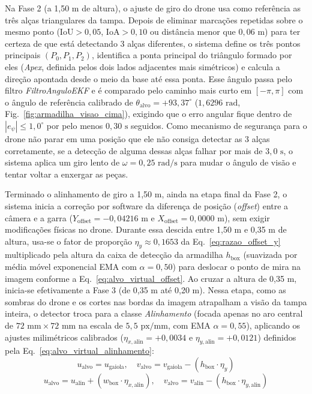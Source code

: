 Na Fase 2 (a 1,50 m de altura), o ajuste de giro do drone usa como referência as três alças triangulares da tampa. Depois de eliminar marcações repetidas sobre o mesmo ponto ($\text{IoU} > 0,05$, $\text{IoA} > 0,10$ ou distância menor que $0,06\text{ m}$) para ter certeza de que está detectando 3 alças diferentes, o sistema define os três pontos principais $(P_0, P_1, P_2)$, identifica a ponta principal do triângulo formado por eles (\textit{Apex}, definida pelos dois lados adjacentes mais simétricos) e calcula a direção apontada desde o meio da base até essa ponta. Esse ângulo passa pelo filtro \textit{FiltroAnguloEKF} e é comparado pelo caminho mais curto em $[-\pi, \pi]$ com o ângulo de referência calibrado de $\theta_{\text{alvo}} = +93,37^\circ$ ($1,6296\text{ rad}$, Fig.~\ref{fig:armadilha_visao_cima}), exigindo que o erro angular fique dentro de $|e_\psi| \le 1,0^\circ$ por pelo menos $0,30\text{ s}$ seguidos. Como mecanismo de segurança para o drone não parar em uma posição que ele não consiga detectar as 3 alças corretamente, se a detecção de alguma dessas alças falhar por mais de $3,0\text{ s}$, o sistema aplica um giro lento de $\omega = 0,25\text{ rad/s}$ para mudar o ângulo de visão e tentar voltar a enxergar as peças.

Terminado o alinhamento de giro a 1,50 m, ainda na etapa final da Fase 2, o sistema inicia a correção por software da diferença de posição (\textit{offset}) entre a câmera e a garra ($Y_{\text{offset}} = -0,04216\text{ m}$ e $X_{\text{offset}} = 0,0000\text{ m}$), sem exigir modificações físicas no drone. Durante essa descida entre 1,50 m e 0,35 m de altura, usa-se o fator de proporção $\eta_y \approx 0,1653$ da Eq.~\eqref{eq:razao_offset_y} multiplicado pela altura da caixa de detecção da armadilha $h_{\text{box}}$ (suavizada por média móvel exponencial EMA com $\alpha = 0,50$) para deslocar o ponto de mira na imagem conforme a Eq.~\eqref{eq:alvo_virtual_offset}. Ao cruzar a altura de 0,35 m, inicia-se efetivamente a Fase 3 (de 0,35 m até 0,20 m). Nessa etapa, como as sombras do drone e os cortes nas bordas da imagem atrapalham a visão da tampa inteira, o detector troca para a classe \textit{Alinhamento} (focada apenas no aro central de $72\text{ mm} \times 72\text{ mm}$ na escala de $5,5\text{ px/mm}$, com EMA $\alpha = 0,55$), aplicando os ajustes milimétricos calibrados ($\eta_{x,\text{alin}} = +0,0034$ e $\eta_{y,\text{alin}} = +0,0121$) definidos pela Eq.~\eqref{eq:alvo_virtual_alinhamento}:
\begin{equation}
	u_{\text{alvo}} = u_{\text{gaiola}}, \quad v_{\text{alvo}} = v_{\text{gaiola}} - (h_{\text{box}} \cdot \eta_y)
	\label{eq:alvo_virtual_offset}
\end{equation}
\begin{equation}
	u_{\text{alvo}} = u_{\text{alin}} + (w_{\text{box}} \cdot \eta_{x,\text{alin}}), \quad v_{\text{alvo}} = v_{\text{alin}} - (h_{\text{box}} \cdot \eta_{y,\text{alin}})
	\label{eq:alvo_virtual_alinhamento}
\end{equation}

